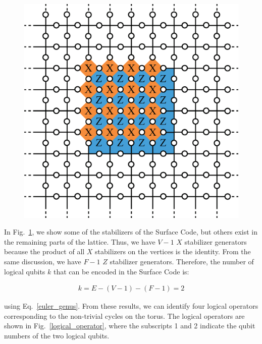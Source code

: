 \documentclass[a4paper,11pt]{ltjsarticle}
\begin{document}
{{        \begin{figure}[h]
            \centering
            \includegraphics[scale=0.40]{figure/local.eps}
            \vspace{0pt}\caption{}
            \label{local}
            \vspace{-10pt}
        \end{figure}

        

    }
    In Fig.~\ref{local}, we show some of the stabilizers of the Surface Code, but others exist in the remaining parts of the lattice. Thus, we have $V - 1$ $X$ stabilizer generators because the product of all $X$ stabilizers on the vertices is the identity. From the same discussion, we have $F - 1$ $Z$ stabilizer generators. Therefore, the number of logical qubits $k$ that can be encoded in the Surface Code is:

    \begin{align}
        k = E - (V - 1) - (F - 1) = 2
    \end{align} 

    using Eq.~\ref{euler_genus}. From these results, we can identify four logical operators corresponding to the non-trivial cycles on the torus. The logical operators are shown in Fig.~\ref{logical_operator}, where the subscripts 1 and 2 indicate the qubit numbers of the two logical qubits.
    
}
\end{document}
